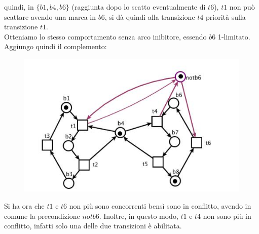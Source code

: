 \documentclass[a4paper,12pt, oneside]{book}
\begin{document}
\begin{esempio}
  quindi, in $\{b1,b4,b6\}$ (raggiunta dopo lo scatto eventualmente di $t6$),
  $t1$ non può scattare avendo una marca in $b6$, si 
  dà quindi alla transizione $t4$ priorità sulla transizione $t1$.\\
  Otteniamo lo stesso comportamento senza arco inibitore, essendo $b6$
  1-limitato. Aggiungo quindi il complemento:
  \begin{figure}[H]
    \centering
    \includegraphics[scale = 0.57]{img/inib6.jpg}
  \end{figure}
  Si ha ora che $t1$ e $t6$ non più sono concorrenti bensì sono in
  conflitto, avendo in comune la precondizione $notb6$. Inoltre, in questo modo,
  $t1$ e $t4$ non sono più in conflitto, infatti solo una delle due transizioni
  è abilitata. 
\end{esempio}
\end{document}
